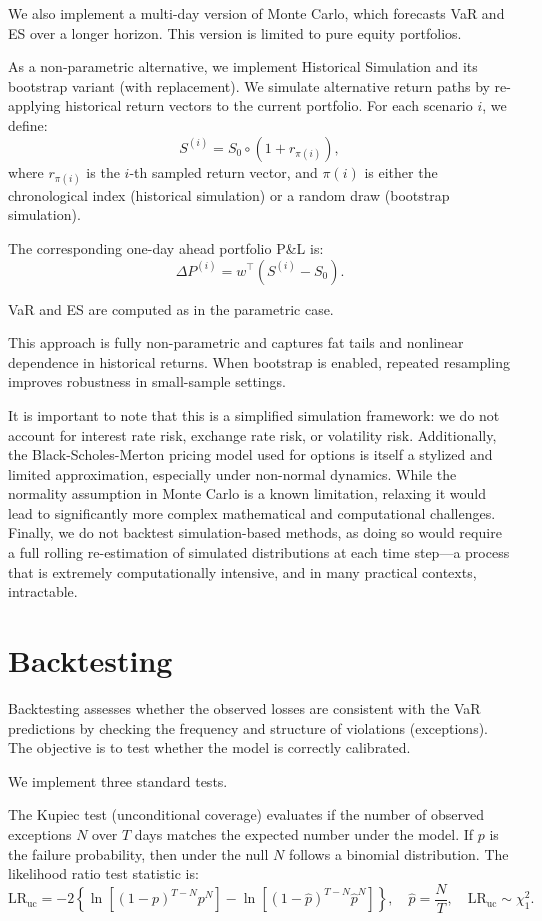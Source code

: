 \documentclass[12pt]{article}
\begin{document}
We also implement a multi-day version of Monte Carlo, which forecasts VaR and ES over a longer horizon. This version is limited to pure equity portfolios.

As a non-parametric alternative, we implement Historical Simulation and its bootstrap variant (with replacement). We simulate alternative return paths by re-applying historical return vectors to the current portfolio. For each scenario \( i \), we define:
\[
S^{(i)} = S_0 \circ (1 + r_{\pi(i)}),
\]
where \( r_{\pi(i)} \) is the \( i \)-th sampled return vector, and \( \pi(i) \) is either the chronological index (historical simulation) or a random draw (bootstrap simulation).

The corresponding one-day ahead portfolio P\&L is:
\[
\Delta P^{(i)} = w^\top (S^{(i)} - S_0).
\]

VaR and ES are computed as in the parametric case.

This approach is fully non-parametric and captures fat tails and nonlinear dependence in historical returns. When bootstrap is enabled, repeated resampling improves robustness in small-sample settings.

It is important to note that this is a simplified simulation framework: we do not account for interest rate risk, exchange rate risk, or volatility risk. Additionally, the Black-Scholes-Merton pricing model used for options is itself a stylized and limited approximation, especially under non-normal dynamics. While the normality assumption in Monte Carlo is a known limitation, relaxing it would lead to significantly more complex mathematical and computational challenges. Finally, we do not backtest simulation-based methods, as doing so would require a full rolling re-estimation of simulated distributions at each time step—a process that is extremely computationally intensive, and in many practical contexts, intractable.


\section{Backtesting}


Backtesting assesses whether the observed losses are consistent with the VaR predictions by checking the frequency and structure of violations (exceptions). The objective is to test whether the model is correctly calibrated.

We implement three standard tests.

The Kupiec test (unconditional coverage) evaluates if the number of observed exceptions $N$ over $T$ days matches the expected number under the model. If $p$ is the failure probability, then under the null $N$ follows a binomial distribution. The likelihood ratio test statistic is:
\[
\text{LR}_{\text{uc}} = -2 \left\{ \ln\left[(1 - p)^{T - N} p^N \right] - \ln\left[(1 - \hat{p})^{T - N} \hat{p}^N \right] \right\}, \quad \hat{p} = \frac{N}{T}, \quad \text{LR}_{\text{uc}} \sim \chi^2_1.
\]
\end{document}
